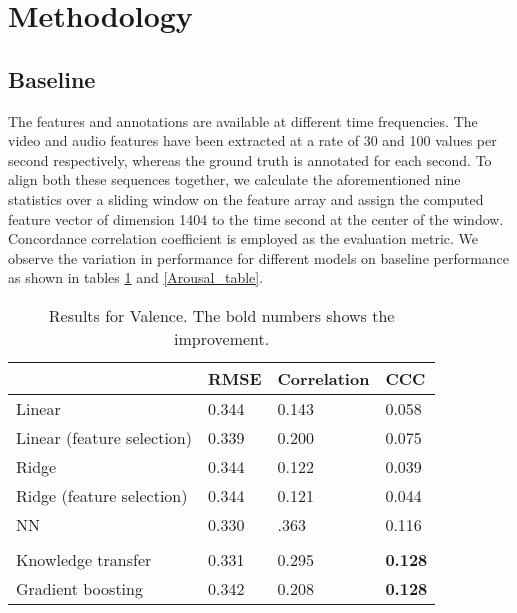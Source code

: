 \documentclass{article}
\begin{document}
\section{Methodology}


\subsection{Baseline}
The features and annotations are available at different time frequencies. The video and audio features have been extracted at a rate of 30 and 100 values per second respectively, whereas the ground truth is annotated for each second. To align both these sequences together, we calculate the aforementioned nine statistics over a sliding window on the feature array and assign the computed feature vector of dimension 1404 to the time second at the center of the window. Concordance correlation coefficient is employed as the evaluation metric. We observe the variation in performance for different models on baseline performance as shown in tables \ref{Valence_table} and \ref{Arousal_table}. 


\begin{table}[h]
\centering
\begin{tabular}{|l|l|l|l|}
\hline
						& RMSE		& Correlation 	& CCC 	 \\ \hline
Linear 					& 0.344		& 0.143		& 0.058  \\ \hline	
Linear (feature selection)		& 0.339		& 0.200 		& 0.075	 \\ \hline
Ridge					& 0.344 		& 0.122		& 0.039	 \\ \hline
Ridge (feature selection)		& 0.344		& 0.121		& 0.044	 \\ \hline
NN						& 0.330		& .363		& 0.116 \\ \hline
& & & \\ \hline
Knowledge transfer 		& 0.331		& 0.295		& \textbf{0.128}	 \\ \hline
Gradient boosting 			& 0.342 		& 0.208 		& \textbf{0.128}  \\ \hline
\end{tabular}
\caption{Results for Valence. The bold numbers shows the improvement.}
\label{Valence_table}
\end{table}
\end{document}
